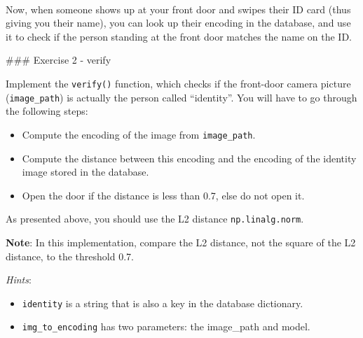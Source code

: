 \documentclass[11pt]{article}
\providecommand{\tightlist}{%
      \setlength{\itemsep}{0pt}\setlength{\parskip}{0pt}}
\newcommand{\prompt}[4]{
        \ttfamily\llap{{\color{#2}[#3]:\hspace{3pt}#4}}\vspace{-\baselineskip}
    }
\begin{document}
            
\prompt{Out}{outcolor}{70}{}
    
    \begin{center}
    \end{center}
    { \hspace*{\fill} \\}
    

    Now, when someone shows up at your front door and swipes their ID card
(thus giving you their name), you can look up their encoding in the
database, and use it to check if the person standing at the front door
matches the name on the ID.

\#\#\# Exercise 2 - verify

Implement the \texttt{verify()} function, which checks if the front-door
camera picture (\texttt{image\_path}) is actually the person called
``identity''. You will have to go through the following steps:

\begin{itemize}
\tightlist
\item
  Compute the encoding of the image from \texttt{image\_path}.
\item
  Compute the distance between this encoding and the encoding of the
  identity image stored in the database.
\item
  Open the door if the distance is less than 0.7, else do not open it.
\end{itemize}

As presented above, you should use the L2 distance
\texttt{np.linalg.norm}.

\textbf{Note}: In this implementation, compare the L2 distance, not the
square of the L2 distance, to the threshold 0.7.

\emph{Hints}:

\begin{itemize}
\tightlist
\item
  \texttt{identity} is a string that is also a key in the database
  dictionary.
\item
  \texttt{img\_to\_encoding} has two parameters: the image\_path and
  model.
\end{itemize}
\end{document}
